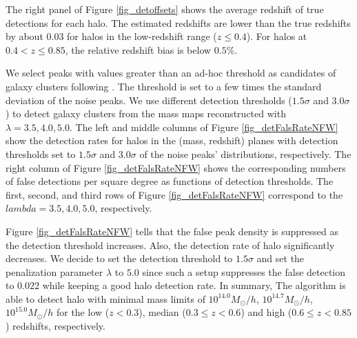 The right panel of Figure \ref{fig_detoffsets} shows the average redshift of
true detections for each halo. The estimated redshifts are lower than the true
redshifts by about $0.03$ for halos in the low-redshift range ($z\leq
0.4$).  For halos at $0.4<z\leq 0.85$, the relative redshift bias is below
$0.5\%$.

We select peaks with values greater than an ad-hoc threshold as candidates of
galaxy clusters following \citet{HSC1-massMap-cluster}.  The threshold is set
to a few times the standard deviation of the noise peaks. We use different
detection thresholds ($1.5\sigma$ and $3.0\sigma$) to detect galaxy clusters
from the mass maps reconstructed with $\lambda=3.5,4.0,5.0$. The left and
middle columns of Figure \ref{fig_detFalsRateNFW} show the detection rates for
halos in the (mass, redshift) planes with detection thresholds set to
$1.5\sigma$ and $3.0\sigma$ of the noise peaks' distributions, respectively.
The right column of Figure \ref{fig_detFalsRateNFW} shows the corresponding
numbers of false detections per square degree as functions of detection
thresholds. The first, second, and third rows of Figure
\ref{fig_detFalsRateNFW} correspond to the $lambda=3.5,4.0,5.0$, respectively.

Figure \ref{fig_detFalsRateNFW} tells that the false peak density is suppressed
as the detection threshold increases. Also, the detection rate of halo
significantly decreases. We decide to set the detection threshold to
$1.5\sigma$ and set the penalization parameter $\lambda$ to $5.0$ since such a
setup suppresses the false detection to $0.022$ while keeping a good halo
detection rate. In summary, The algorithm is able to detect halo with minimal
mass limits of $10^{14.0} M_{\odot}/h$, $10^{14.7} M_{\odot}/h$, $10^{15.0}
M_{\odot}/h$ for the low ($z<0.3$), median ($0.3\leq z< 0.6$) and high
($0.6\leq z< 0.85$) redshifts, respectively.

